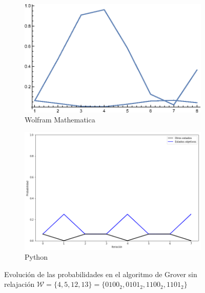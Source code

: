 \begin{figure}[H]
    \centering
    \begin{subfigure}[m]{0.49\textwidth}
        \centering
        \includegraphics[width=0.9\linewidth]{img/Grover-2_gr1.eps}
        \caption{Wolfram Mathematica}
    \end{subfigure}
    \begin{subfigure}[m]{0.49\textwidth}
        \centering
        \includegraphics[width=0.9\linewidth]{img/grover3lossless.png}
        \caption{Python}
    \end{subfigure}
    \caption[Evolución de las probabilidades en el algoritmo de Grover sin relajación $\mathcal{W} = \{4, 5, 12, 13\}$]{Evolución de las probabilidades en el algoritmo de Grover sin relajación $\mathcal{W} = \{4, 5, 12, 13\} = \{0100_2, 0101_2, 1100_2, 1101_2\}$}
    \label{fig:groverlosslesscomp3}
\end{figure}

